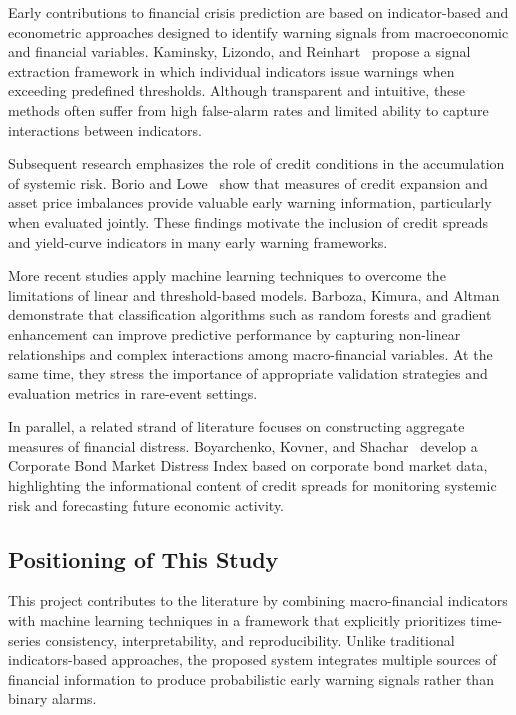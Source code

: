 \documentclass[11pt,a4paper]{article}
\begin{document}
Early contributions to financial crisis prediction are based on indicator-based and econometric approaches designed to identify warning signals from macroeconomic and financial variables. Kaminsky, Lizondo, and Reinhart~\cite{kaminsky1998} propose a signal extraction framework in which individual indicators issue warnings when exceeding predefined thresholds. Although transparent and intuitive, these methods often suffer from high false-alarm rates and limited ability to capture interactions between indicators.

Subsequent research emphasizes the role of credit conditions in the accumulation of systemic risk. Borio and Lowe~\cite{borio2002} show that measures of credit expansion and asset price imbalances provide valuable early warning information, particularly when evaluated jointly. These findings motivate the inclusion of credit spreads and yield-curve indicators in many early warning frameworks.

More recent studies apply machine learning techniques to overcome the limitations of linear and threshold-based models. Barboza, Kimura, and Altman~\cite{barboza2017} demonstrate that classification algorithms such as random forests and gradient enhancement can improve predictive performance by capturing non-linear relationships and complex interactions among macro-financial variables. At the same time, they stress the importance of appropriate validation strategies and evaluation metrics in rare-event settings.

In parallel, a related strand of literature focuses on constructing aggregate measures of financial distress. Boyarchenko, Kovner, and Shachar~\cite{boyarchenko2025} develop a Corporate Bond Market Distress Index based on corporate bond market data, highlighting the informational content of credit spreads for monitoring systemic risk and forecasting future economic activity.

\subsection{Positioning of This Study}
\label{subsec:positioning}

This project contributes to the literature by combining macro-financial indicators with machine learning techniques in a framework that explicitly prioritizes time-series consistency, interpretability, and reproducibility. Unlike traditional indicators-based approaches, the proposed system integrates multiple sources of financial information to produce probabilistic early warning signals rather than binary alarms.
\end{document}
